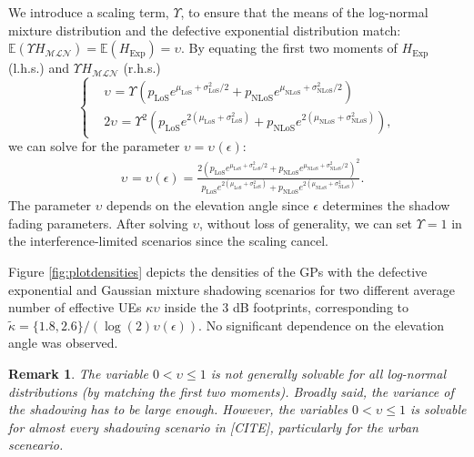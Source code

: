 \documentclass[lettersize,journal]{IEEEtran}
\newtheorem*{remark}{Remark}
\begin{document}
 We introduce a scaling term, $\Upsilon$, to ensure that the means of the log-normal mixture distribution and the defective exponential distribution match: $\mathbb{E}(\Upsilon H_{\mathcal{MLN}}) = \mathbb{E}(H_{\text{Exp}}) = \upsilon$. By equating the first two moments of $H_{\text{Exp}}$ (l.h.s.) and $\Upsilon_{} H_{\mathcal{M} \mathcal{L}\mathcal{N}}$ (r.h.s.)
\begin{equation}
  \label{eq:matchingmoments}
  \begin{cases}
    &\upsilon_{} = \Upsilon_{} \left(p_{\text{LoS}} e^{\mu_{\text{LoS}} + \sigma_{\text{LoS}}^2/2} + p_{\text{NLoS}} e^{\mu_{\text{NLoS}} + \sigma_{\text{NLoS}}^2/2}\right)\\
    &2\upsilon_{}= \Upsilon_{}^2 \left( p_{\text{LoS}} e^{2(\mu_{\text{LoS}} + \sigma_{\text{LoS}}^2)} + p_{\text{NLoS}} e^{2(\mu_{\text{NLoS}} + \sigma_{\text{NLoS}}^2)} \right), 
  \end{cases}
\end{equation}
 we can solve for the parameter $\upsilon= \upsilon_{}(\epsilon)$:
\begin{align}
  \label{eq:upsilon}
  & \upsilon_{}=\upsilon(\epsilon) =\frac{ 2\left( p_{\text{LoS}}e^{\mu_{\text{LoS}}+\sigma^2_{\text{LoS}}/2}+p_{\text{NLoS}}e^{\mu_{\text{NLoS}}+\sigma^2_{\text{NLoS}}/2} \right)^2}{p_{\text{LoS}}e^{2(\mu_{\text{LoS}}+\sigma_{\text{LoS}}^2)}+p_{\text{NLoS}}e^{2(\mu_{\text{NLoS}}+\sigma_{\text{NLoS}}^2)}}.
\end{align}
The parameter $\upsilon$ depends on the elevation angle since $\epsilon$ determines the shadow fading parameters. After solving $\upsilon$, without loss of generality, we can set $\Upsilon = 1$ in the interference-limited scenarios since the scaling cancel. 


Figure \ref{fig:plotdensities} depicts the densities of the GPs with the defective exponential and Gaussian mixture shadowing scenarios for two different average number of effective UEs $\kappa \upsilon $ inside the $3$ dB footprints, corresponding to $\tilde{\kappa}=  \{1.8,2.6\}/(\log(2)\upsilon(\epsilon))$. No significant dependence on the elevation angle was observed.

\begin{remark}
  The variable $0 < \upsilon \leq 1$ is not generally solvable for all log-normal distributions (by matching the first two moments). Broadly said, the variance of the shadowing has to be large enough. However, the variables $0<\upsilon \leq 1$ is solvable for almost every shadowing scenario in [CITE], particularly for the urban sceneario.
\end{remark}
\end{document}
